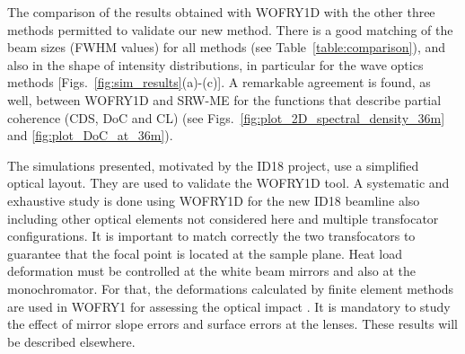\documentclass{iucr}              %
\begin{document}
The comparison of the results obtained with WOFRY1D with the other three methods permitted to validate our new method.
There is a good matching of the beam sizes (FWHM values) for all methods (see Table~\ref{table:comparison}), and also in the shape of intensity distributions, in particular for the wave optics methods [Figs.~\ref{fig:sim_results}(a)-(c)]. 
A remarkable agreement is found, as well, between WOFRY1D and SRW-ME for the functions that describe partial coherence (CDS, DoC and CL) (see Figs.~\ref{fig:plot_2D_spectral_density_36m} and \ref{fig:plot_DoC_at_36m}).

The simulations presented, motivated by the ID18 project, use a simplified optical layout. They are used to validate the WOFRY1D tool. 
A systematic and exhaustive study is done using WOFRY1D for the new ID18 beamline also including other optical elements not considered here and multiple transfocator configurations. It is important to match correctly the two transfocators to guarantee that the focal point is located at the sample plane. Heat load deformation must be controlled at the white beam mirrors and also at the monochromator. For that, the deformations calculated by finite element methods are used in WOFRY1 for assessing the optical impact \cite{srioLBL}. It is mandatory to study the effect of mirror slope errors and surface errors at the lenses. These results will be described elsewhere.





\end{document}

